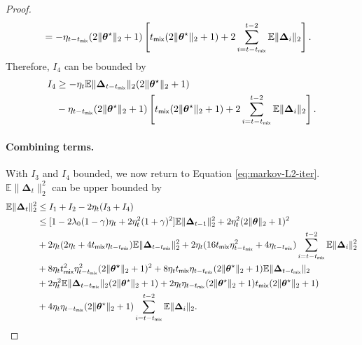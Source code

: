 \begin{proof}
\begin{align*}
&= -\eta_{t-t_{\mathsf{mix}}}(2\|\bm{\theta}^\star\|_2 + 1) \left[t_{\mathsf{mix}}(2\|\bm{\theta}^\star\|_2 + 1) + 2\sum_{i=t-t_{\mathsf{mix}}}^{t-2} \mathbb{E}\|\bm{\Delta}_i\|_2 \right].
\end{align*}
Therefore, $I_4$ can be bounded by
\begin{align}\label{eq:markov-L2-I4-bound}
I_4 &\geq -\eta_t \mathbb{E}\|\bm{\Delta}_{t-t_{\mathsf{mix}}}\|_2 (2\|\bm{\theta}^\star\|_2 + 1) \nonumber \\ 
&-\eta_{t-t_{\mathsf{mix}}}(2\|\bm{\theta}^\star\|_2 + 1) \left[t_{\mathsf{mix}}(2\|\bm{\theta}^\star\|_2 + 1) + 2\sum_{i=t-t_{\mathsf{mix}}}^{t-2} \mathbb{E}\|\bm{\Delta}_i\|_2 \right].
\end{align}
\paragraph{Combining terms.} With $I_3$ and $I_4$ bounded, we now return to Equation \eqref{eq:markov-L2-iter}. $\mathbb{E}\|\bm{\Delta}_{t}\|_2^2$ can be upper bounded by 
\begin{align}\label{eq:markov-L2-iter-bound}
\mathbb{E}\|\bm{\Delta}_{t}\|_2^2 &\leq I_1 + I_2 - 2\eta_t(I_3 + I_4) \nonumber \\ 
&\leq [1-2\lambda_0(1-\gamma)\eta_t + 2\eta_t^2(1+\gamma)^2]\mathbb{E}\|\bm{\Delta}_{t-1}\|_2^2 + 2\eta_t^2(2\|\bm{\theta}\|_2+1)^2 \nonumber \\
&+2\eta_t (2\eta_t +4t_{\mathsf{mix}}\eta_{t-t_{\mathsf{mix}}})\mathbb{E}\|\bm{\Delta}_{t-t_{\mathsf{mix}}}\|_2^2 + 2\eta_t (16 t_{\mathsf{mix}} \eta_{t-t_{\mathsf{mix}}}^2+ 4\eta_{t - t_{\mathsf{mix}}})\sum_{i=t-t_{\mathsf{mix}}}^{t-2}\mathbb{E}\|\bm{\Delta}_i\|_2^2 \nonumber \\ 
&+8\eta_t t_{\mathsf{mix}}^2 \eta_{t-t_{\mathsf{mix}}}^2 (2\|\bm{\theta^\star}\|_2 + 1)^2 + 8\eta_t t_{\mathsf{mix}}\eta_{t-t_{\mathsf{mix}}}(2\|\bm{\theta}^\star\|_2 +1)\mathbb{E}\|\bm{\Delta}_{t- t_{\mathsf{mix}}}\|_2 \nonumber \\ 
&+ 2\eta_t^2 \mathbb{E}\|\bm{\Delta}_{t-t_{\mathsf{mix}}}\|_2 (2\|\bm{\theta}^\star\|_2 + 1) +2\eta_t \eta_{t-t_{\mathsf{mix}}}(2\|\bm{\theta}^\star\|_2 + 1)t_{\mathsf{mix}}(2\|\bm{\theta}^\star\|_2 + 1) \nonumber \\ 
&+4\eta_t \eta_{t-t_{\mathsf{mix}}}(2\|\bm{\theta}^\star\|_2 + 1)\sum_{i=t-t_{\mathsf{mix}}}^{t-2} \mathbb{E}\|\bm{\Delta}_i\|_2 .
\end{align}

\end{proof}

